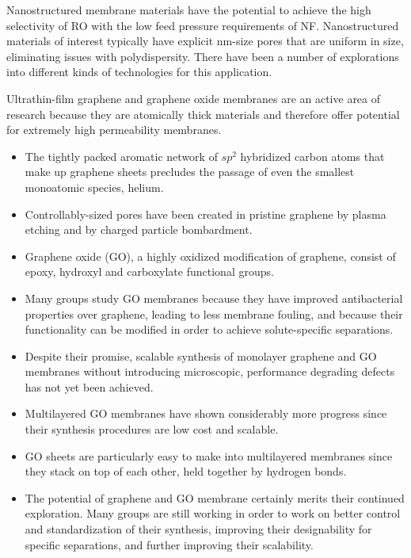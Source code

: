   Nanostructured membrane materials have the potential to achieve the high selectivity
  of RO with the low feed pressure requirements of NF. Nanostructured materials of 
  interest typically have explicit nm-size pores that are uniform in size, eliminating
  issues with polydispersity. There have been a number of explorations into different
  kinds of technologies for this application.
  
  
  
  Ultrathin-film graphene and graphene oxide membranes are an active area of research because
  they are atomically thick materials and therefore offer potential for extremely high
  permeability membranes.~\cite{humplik_nanostructured_2011} 
  \begin{itemize}
    \item The tightly packed aromatic network of $sp^2$ hybridized carbon atoms that 
    make up graphene sheets precludes the passage of even the smallest monoatomic species, helium.~\cite{bunch_impermeable_2008}
    \item Controllably-sized pores have been created in pristine graphene by plasma etching
    and by charged particle bombardment.~\cite{surwade_water_2015,russo_atom-by-atom_2012}
    \item Graphene oxide (GO), a highly oxidized modification of graphene, consist of epoxy,
    hydroxyl and carboxylate functional groups.~\cite{hegab_graphene_2015}
    \item Many groups study GO membranes because they have improved antibacterial properties 
    over graphene, leading to less membrane fouling, and because their functionality can be
    modified in order to achieve solute-specific separations.~\cite{liu_antibacterial_2011,he_bioinspired_2013}
    \item Despite their promise, scalable synthesis of monolayer graphene and GO membranes without
    introducing microscopic, performance degrading defects has not yet been achieved.~\cite{cohen-tanugi_multilayer_2016,wei_multilayered_2018}
    \item Multilayered GO membranes have shown considerably more progress since their 
    synthesis procedures are low cost and scalable.~\cite{zhang_size-controlled_2009}
    \item GO sheets are particularly easy to make into multilayered membranes since they 
    stack on top of each other, held together by hydrogen bonds.~\cite{homaeigohar_graphene_2017}
    \item The potential of graphene and GO membrane certainly merits their continued exploration. Many
    groups are still working in order to work on better control and standardization of their synthesis,
    improving their designability for specific separations, and further improving their scalability.~\cite{wei_multilayered_2018}
  \end{itemize}    
  
